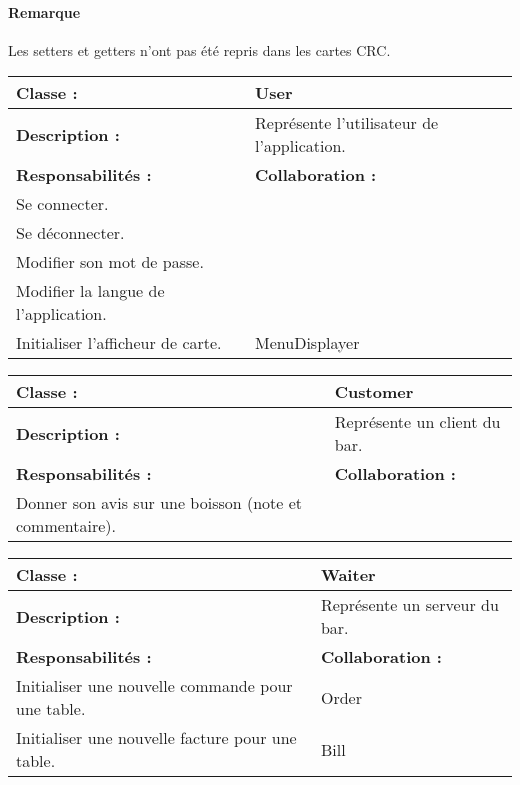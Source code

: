 

\paragraph{Remarque} Les setters et getters
n'ont pas été repris dans les cartes CRC.

\begin{center}

\begin{tabular}{|p{6cm}p{6cm}|}
	\hline
		\textbf{Classe :} & User \\
	\hline
		\textbf{Description :} & Représente l'utilisateur de l'application. \\
	\hline
		\textbf{Responsabilités :} & \textbf{Collaboration :} \\
		Se connecter. & \\
		Se déconnecter. & \\
		Modifier son mot de passe. & \\
		Modifier la langue de l'application. & \\
		Initialiser l'afficheur de carte. & MenuDisplayer \\
	\hline		
\end{tabular}

\vspace{0.5cm}

\begin{tabular}{|p{6cm}p{6cm}|}
	\hline
		\textbf{Classe :} & Customer \\
	\hline
		\textbf{Description :} & Représente un client du bar. \\
	\hline
		\textbf{Responsabilités :} & \textbf{Collaboration :} \\
		Donner son avis sur une boisson (note et commentaire). & \\
	\hline		
\end{tabular}

\vspace{0.5cm}

\begin{tabular}{|p{6cm}p{6cm}|}
	\hline
		\textbf{Classe :} & Waiter \\
	\hline
		\textbf{Description :} & Représente un serveur du bar. \\
	\hline
		\textbf{Responsabilités :} & \textbf{Collaboration :} \\
		Initialiser une nouvelle commande pour une table. & Order \\
		Initialiser une nouvelle facture pour une table. & Bill \\
	\hline		
\end{tabular}


\end{center}
